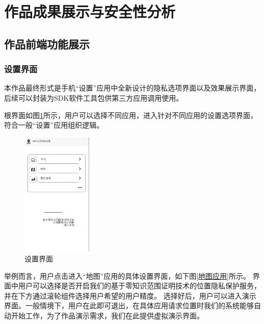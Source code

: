 \documentclass[zihao=-4]{ctexart}
\begin{document}
\section{作品成果展示与安全性分析}
\subsection{作品前端功能展示}
\subsubsection{设置界面}
本作品最终形式是手机“设置”应用中全新设计的隐私选项界面以及效果展示界面，后续可以封装为SDK软件工具包供第三方应用调用使用。
\par
根界面如图\ref{根目录}所示，用户可以选择不同应用，进入针对不同应用的设置选项界面，符合一般“设置”应用组织逻辑。
%
\begin{figure}[H] %
    \centering %
    \includegraphics[width=0.3\textwidth]{前端-1.jpg} %
    \caption{设置界面} %
    \label{根目录} %
\end{figure}
\par
举例而言，用户点击进入“地图”应用的具体设置界面，如下图\ref{地图应用}所示。
界面中用户可以选择是否开启我们的基于零知识范围证明技术的位置隐私保护服务，并在下方通过滚轮组件选择用户希望的用户精度。
选择好后，用户可以进入演示界面。一般情境下，用户在此即可退出，在具体应用请求位置时我们的系统能够自动开始工作，为了作品演示需求，我们在此提供虚拟演示界面。
\end{document}
